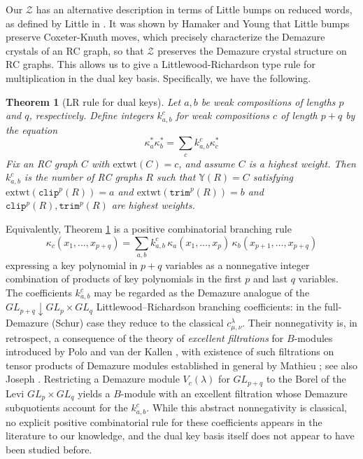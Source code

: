\documentclass{amsart}
\newtheorem{theorem}{Theorem}[section]
\theoremstyle{definition}
\theoremstyle{remark}
\numberwithin{equation}{subsection}
\newcommand{\trm}{\mathtt{trim}}
\newcommand{\zeromap}{\mathcal{Z}}
\newcommand{\clp}{\mathtt{clip}}
\newcommand{\RC}{\mathcal{RC}}
\begin{document}
Our $\zeromap$ has an alternative description in terms of Little bumps on reduced words, as defined by Little in \cite{little2003combinatorial}. It was shown by Hamaker and Young \cite{hamaker2014relating} that Little bumps preserve Coxeter-Knuth moves, which precisely characterize the Demazure crystals of an RC graph, so that $\zeromap$ preserves the Demazure crystal structure on RC graphs. This allows us to give a Littlewood-Richardson type rule for multiplication in the dual key basis. Specifically, we have the following.
\begin{theorem}[LR rule for dual keys] \label{theorem:LRkey}
Let $a,b$ be weak compositions of lengths $p$ and $q$, respectively. Define integers $k_{a,b}^c$ for weak compositions $c$ of length $p+q$ by the equation
$$\kappa_a^*\kappa_b^* = \sum_{c} k_{a,b}^c\kappa_c^*$$
Fix an RC graph $C$ with $\mathrm{extwt}(C)=c$, and assume $C$ is a highest weight. Then $k_{a,b}^c$ is the number of RC graphs $R$ such that $\mathbb{Y}(R)=C$ satisfying $\mathrm{extwt}(\clp^p(R)) = a$ and $\mathrm{extwt}(\trm^p(R)) = b$ and $\clp^p(R),\trm^p(R)$ are highest weights.

\end{theorem}

Equivalently, Theorem \ref{theorem:LRkey} is a positive combinatorial branching rule
$$\kappa_c(x_1,\ldots,x_{p+q}) = \sum_{a,b} k_{a,b}^c\,\kappa_a(x_1,\ldots,x_p)\,\kappa_b(x_{p+1},\ldots,x_{p+q})$$
expressing a key polynomial in $p+q$ variables as a nonnegative integer combination of products of key polynomials in the first $p$ and last $q$ variables. The coefficients $k_{a,b}^c$ may be regarded as the Demazure analogue of the $GL_{p+q}\downarrow GL_p\times GL_q$ Littlewood--Richardson branching coefficients: in the full-Demazure (Schur) case they reduce to the classical $c_{\mu,\nu}^{\lambda}$. Their nonnegativity is, in retrospect, a consequence of the theory of \emph{excellent filtrations} for $B$-modules introduced by Polo \cite{polo1989excellent} and van der Kallen \cite{vanderkallen1989longest}, with existence of such filtrations on tensor products of Demazure modules established in general by Mathieu \cite{mathieu1990filtrations}; see also Joseph \cite{joseph1985demazure}. Restricting a Demazure module $V_c(\lambda)$ for $GL_{p+q}$ to the Borel of the Levi $GL_p\times GL_q$ yields a $B$-module with an excellent filtration whose Demazure subquotients account for the $k_{a,b}^c$. While this abstract nonnegativity is classical, no explicit positive combinatorial rule for these coefficients appears in the literature to our knowledge, and the dual key basis itself does not appear to have been studied before.
\end{document}
